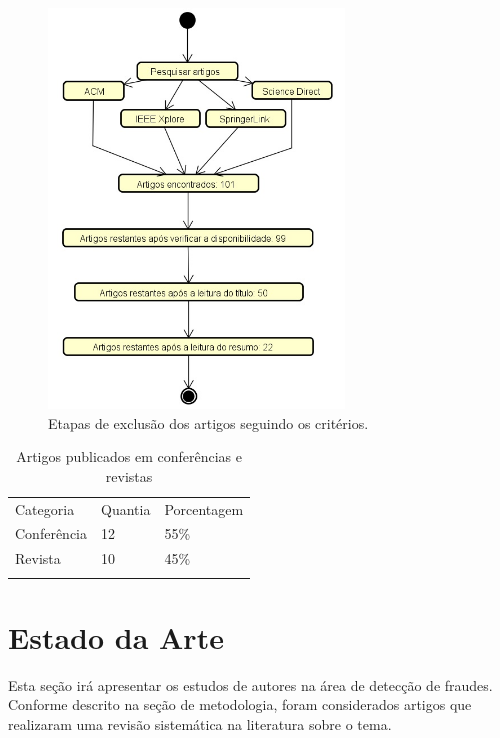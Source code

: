 \documentclass[smallextended]{svjour3}
\begin{document}
\begin{figure}[!ht]
	\centering
	\includegraphics[width=0.7\textwidth]{imagens/diagramaexclusaoartigos.jpg}
	\caption{Etapas de exclusão dos artigos seguindo os critérios.}
	\label{fig:diagramaexlusaoartigos}
\end{figure}

\begin{table}
	\caption{Artigos publicados em conferências e revistas}
	\label{tab:conferenciasrevistas}       %
	\begin{tabular}[!Ht]{lll}
		\hline\noalign{\smallskip}
		Categoria & Quantia & Porcentagem  \\
		\noalign{\smallskip}\hline\noalign{\smallskip}
		Conferência & 12 & 55\% \\
		Revista & 10 & 45\% \\
		\noalign{\smallskip}\hline
	\end{tabular}
\end{table}

\section{Estado da Arte}
\label{sec:4}

Esta seção irá apresentar os estudos de autores na área de detecção de fraudes. Conforme descrito na seção de metodologia, foram considerados artigos que realizaram uma revisão sistemática na literatura sobre o tema.
\end{document}
